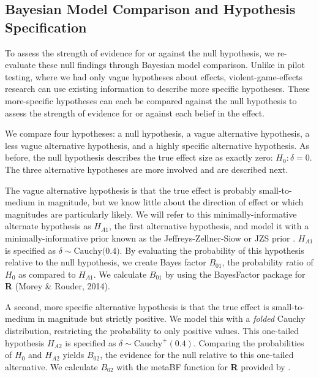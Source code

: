 \documentclass[man]{apa6}
\begin{document}
\subsection{Bayesian Model Comparison and Hypothesis Specification}
To assess the strength of evidence for or against the null hypothesis, we re-evaluate these null findings through Bayesian model comparison. Unlike in pilot testing, where we had only vague hypotheses about effects, violent-game-effects research can use existing information to describe more specific hypotheses. These more-specific hypotheses can each be compared against the null hypothesis to assess the strength of evidence for or against each belief in the effect.

We compare four hypotheses: a null hypothesis, a vague alternative hypothesis, a less vague alternative hypothesis, and a highly specific alternative hypothesis. As before, the null hypothesis describes the true effect size as exactly zero: $H_0: \delta = 0$. The three alternative hypotheses are more involved and are described next. 

The vague alternative hypothesis is that the true effect is probably small-to-medium in magnitude, but we know little about the direction of effect or which magnitudes are particularly likely. We will refer to this minimally-informative alternate hypothesis as $H_{A1}$, the first alternative hypothesis, and model it with a minimally-informative prior known as the Jeffreys-Zellner-Siow or JZS prior \citep[see ][]{Jeffreys:1961,Liang:etal:2008,Rouder:etal:2009a,Zellner:Siow:1980}. %
$H_{A1}$ is specified as $\delta \sim \mbox{Cauchy(0.4)}$. By evaluating the probability of this hypothesis relative to the null hypothesis, we create Bayes factor $B_{01}$, the probability ratio of $H_0$ as compared to $H_{A1}$. We calculate $B_{01}$ by using the BayesFactor package for \textbf{R} (Morey \& Rouder, 2014).  

A second, more specific alternative hypothesis is that the true effect is small-to-medium in magnitude but strictly positive. We model this with a {\em folded} Cauchy distribution, restricting the probability to only positive values. This one-tailed hypothesis $H_{A2}$ is specified as $\delta \sim \mbox{Cauchy}^{+}(0.4)$. Comparing the probabilities of $H_0$ and $H_{A2}$ yields $B_{02}$, the evidence for the null relative to this one-tailed alternative. We calculate $B_{02}$ with the metaBF function for \textbf{R} provided by \citet{Rouder:Morey:2011}.
\end{document}
